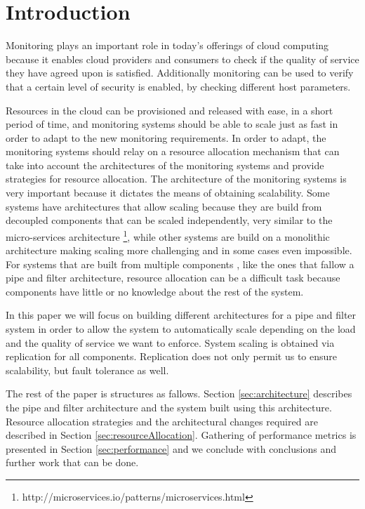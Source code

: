 \section*{Introduction}

Monitoring plays an important role in today's offerings of cloud computing because it enables cloud providers and consumers to check if the quality of service they have agreed upon is satisfied. Additionally monitoring can be used to verify that a certain level of security is enabled, by checking different host parameters.

Resources in the cloud can be provisioned and released with ease, in a short period of time, and monitoring systems should be able to scale just as fast in order to adapt to the new monitoring requirements. In order to adapt, the monitoring systems should relay on a resource allocation mechanism that can take into account the architectures of the monitoring systems and provide strategies for resource allocation. The architecture of the monitoring systems is very important because it dictates the means of obtaining scalability. Some systems have architectures that allow scaling because they are build from decoupled components that can be scaled independently, very similar to the micro-services architecture \footnote{http://microservices.io/patterns/microservices.html}, while other systems are build on a monolithic architecture making scaling more challenging and in some cases even impossible. For systems that are built from multiple components , like the ones that fallow a pipe and filter architecture, resource allocation can be a difficult task because components have little or no knowledge about the rest of the system.


In this paper we will focus on building different architectures for a pipe and filter system in order to allow the system to automatically scale depending on the load and the quality of service we want to enforce. System scaling is obtained via replication for all components. Replication does not only permit us to ensure scalability, but fault tolerance as well.

The rest of the paper is structures as fallows. Section \ref{sec:architecture} describes the pipe and filter architecture and the system built using this architecture. Resource allocation strategies and the architectural changes required are described in Section \ref{sec:resourceAllocation}. Gathering of performance metrics is presented in Section \ref{sec:performance} and we conclude with conclusions and further work that can be done.
